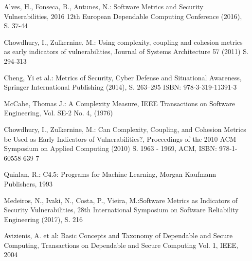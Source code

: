 
\begin{thebibliography}{8}
Alves, H., Fonseca, B., Antunes, N.: Software Metrics and Security Vulnerabilities, 2016 12th European Dependable Computing Conference (2016), S. 37-44

Chowdhury, I., Zulkernine, M.: Using complexity, coupling and cohesion metrics as early indicators of vulnerabilities, Journal of Systems Architecture 57 (2011) S. 294-313

Cheng, Yi et al.: Metrics of Security, Cyber Defense and Situational Awareness, Springer International Publishing (2014), S. 263--295
ISBN: 978-3-319-11391-3

McCabe, Thomas J.: A Complexity Measure, IEEE Transactions on Software Engineering, Vol. SE-2 No. 4, (1976)

Chowdhury, I., Zulkernine, M.: Can Complexity, Coupling, and Cohesion Metrics be Used as Early Indicators of Vulnerabilities?, Proceedings of the 2010 ACM Symposium on Applied Computing (2010) S. 1963 - 1969, ACM, ISBN: 978-1-60558-639-7

Quinlan, R.: C4.5: Programs for Machine Learning, Morgan Kaufmann Publishers, 1993

Medeiros, N., Ivaki, N., Costa, P., Vieira, M.:Software Metrics as Indicators of Security Vulnerabilities, 28th International Symposium on Software Reliability Engineering (2017), S. 216

Avizienis, A. et al: Basic Concepts and Taxonomy of Dependable and Secure Computing, Transactions on Dependable and Secure Computing Vol. 1, IEEE, 2004

\end{thebibliography}

